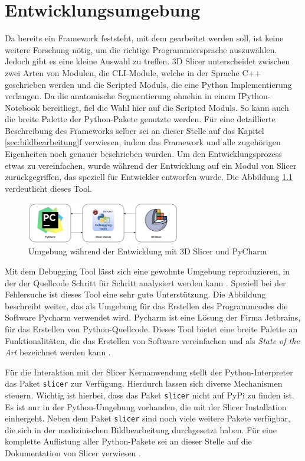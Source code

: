 \chapter{Entwicklungsumgebung}
\label{chap:entwicklungsumgebung} Da bereits ein Framework feststeht, mit dem
gearbeitet werden soll, ist keine weitere Forschung nötig, um die richtige
Programmiersprache auszuwählen. Jedoch gibt es eine kleine Auswahl zu treffen.
3D Slicer unterscheidet zwischen zwei Arten von Modulen, die \ac{CLI}-Module, welche
in der Sprache C++ geschrieben werden und die Scripted Moduls, die eine Python
Implementierung verlangen. Da die anatomische Segmentierung ohnehin in einem IPython-Notebook
bereitliegt, fiel die Wahl hier auf die Scripted Moduls. So kann auch die breite
Palette der Python-Pakete genutzte werden. Für eine detaillierte Beschreibung
des Frameworks selber sei an dieser Stelle auf das Kapitel
\ref{sec:bildbearbeitung}f verwiesen, indem das Framework und alle zugehörigen
Eigenheiten noch genauer beschrieben wurden. Um den Entwicklungsprozess etwas zu
vereinfachen, wurde während der Entwicklung auf ein Modul von Slicer
zurückgegriffen, das speziell für Entwickler entworfen wurde. Die Abbildung
\ref{fig:entwicklungsumgebung} verdeutlicht dieses Tool.

\begin{figure}[h]
	\centering
	\includegraphics[width=0.6\textwidth]{img/Entwicklungsumgebung.png}
	\caption{Umgebung während der Entwicklung mit 3D Slicer und PyCharm}
	\label{fig:entwicklungsumgebung}
\end{figure}

Mit dem Debugging Tool lässt sich eine gewohnte Umgebung reproduzieren, in der
der Quellcode Schritt für Schritt analysiert werden kann \citep[vgl.][]{slicerdebuggingtools}.
Speziell bei der Fehlersuche ist dieses Tool eine sehr gute Unterstützung. Die Abbildung
beschreibt weiter, das als Umgebung für das Erstellen des Programmcodes die
Software Pycharm verwendet wird. Pycharm ist eine Lösung der Firma Jetbrains,
für das Erstellen von Python-Quellcode. Dieses Tool bietet eine breite Palette an
Funktionalitäten, die das Erstellen von Software vereinfachen und als \textit{State
of the Art} bezeichnet werden kann \citep[vgl.][]{jetbrains2024}.

Für die Interaktion mit der Slicer Kernanwendung stellt der Python-Interpreter
das Paket \texttt{slicer} zur Verfügung. Hierdurch lassen sich diverse
Mechanismen steuern. Wichtig ist hierbei, dass das Paket \texttt{slicer} nicht auf
\ac{PyPi} zu finden ist. Es ist nur in der Python-Umgebung vorhanden, die mit
der Slicer Installation einhergeht. Neben dem Paket \texttt{slicer} sind noch
viele weitere Pakete verfügbar, die sich in der medizinischen Bildbearbeitung durchgesetzt
haben. Für eine komplette Auflistung aller Python-Pakete sei an dieser Stelle
auf die Dokumentation von Slicer verwiesen \citep[vgl.][]{slicer2024}.

